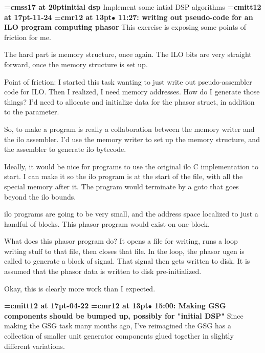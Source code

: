 {\medskip\noindent\bf\font\titlefont=cmss17 at 20pt\titlefont initial dsp}\medskip
Implement some intial DSP algorithms
{\medskip\noindent\bf\font\titlefont=cmitt12 at 17pt-11-24}\medskip
{\smallskip\noindent\bf\font\titlefont=cmr12 at 13pt\titlefont $\bullet$ 11:27: writing out pseudo-code for an ILO program computing phasor}\smallskip
This exercise is exposing some points of friction for me.
\par

The hard part is memory structure, once again. The ILO bits are very straight forward, once the memory structure is set up.
\par

Point of friction: I started this task wanting to just write out pseudo-assembler code for ILO. Then I realized, I need memory addresses. How do I generate those things? I'd need to allocate and initialize data for the phasor struct, in addition to the parameter.
\par

So, to make a program is really a collaboration between the memory writer and the ilo assembler. I'd use the memory writer to set up the memory structure, and the assembler to generate ilo bytecode.
\par

Ideally, it would be nice for programs to use the original ilo C implementation to start. I can make it so the ilo program is at the start of the file, with all the special memory after it. The program would terminate by a goto that goes beyond the ilo bounds.
\par

ilo programs are going to be very small, and the address space localized to just a handful of blocks. This phasor program would exist on one block.
\par

What does this phasor program do? It opens a file for writing, runs a loop writing stuff to that file, then closes that file. In the loop, the phasor ugen is called to generate a block of signal. That signal then gets written to disk. It is assumed that the phasor data is written to disk pre-initialized.
\par

Okay, this is clearly more work than I expected.
\par

{\medskip\noindent\bf\font\titlefont=cmitt12 at 17pt-04-22}\medskip
{\smallskip\noindent\bf\font\titlefont=cmr12 at 13pt\titlefont $\bullet$ 15:00: Making GSG components should be bumped up, possibly for "initial DSP"}\smallskip
Since making the GSG task many months ago, I've reimagined the GSG has a collection of smaller unit generator components glued together in slightly different variations.
\par

